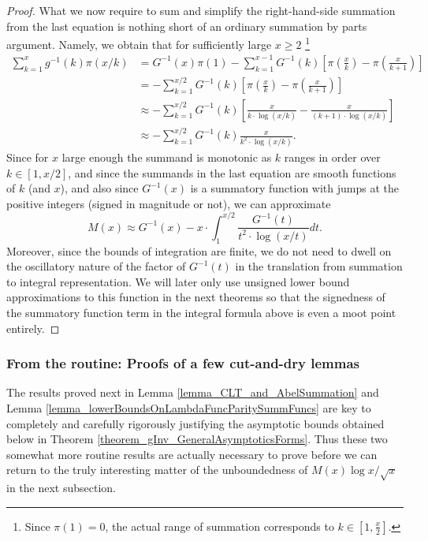 \documentclass[11pt,reqno,a4letter]{article}
\numberwithin{figure}{section}
\numberwithin{table}{section}
\theoremstyle{plain}
\numberwithin{theorem}{section}
\theoremstyle{definition}
\begin{document}
\begin{proof}
What we now require to sum and simplify the right-hand-side summation from the last equation is 
nothing short of an ordinary summation by parts argument. Namely, we obtain that for sufficiently large 
$x \geq 2$ \footnote{
     Since $\pi(1) = 0$, the actual range of summation corresponds to 
     $k \in \left[1, \frac{x}{2}\right]$. 
}
\begin{align*} 
\sum_{k=1}^{x} g^{-1}(k) \pi(x/k) & = G^{-1}(x) \pi(1) - \sum_{k=1}^{x-1} G^{-1}(k) \left[ 
     \pi\left(\frac{x}{k}\right) - \pi\left(\frac{x}{k+1}\right)\right] \\ 
     & = -\sum_{k=1}^{x/2} G^{-1}(k) \left[ 
     \pi\left(\frac{x}{k}\right) - \pi\left(\frac{x}{k+1}\right)\right] \\ 
     & \approx -\sum_{k=1}^{x/2} G^{-1}(k) \left[ 
     \frac{x}{k \cdot \log(x/k)} - \frac{x}{(k+1) \cdot \log(x/k)}\right] \\ 
     & \approx -\sum_{k=1}^{x/2} G^{-1}(k) \frac{x}{k^2 \cdot \log(x/k)}. 
\end{align*} 
Since for $x$ large enough the summand is monotonic as $k$ ranges in order over $k \in [1, x/2]$, and 
since the summands in the last equation are smooth functions of $k$ (and $x$), and also since $G^{-1}(x)$ is 
a summatory function with jumps at the positive integers (signed in magnitude or not), we can approximate 
\[
M(x) \approx G^{-1}(x) - x \cdot \int_1^{x/2} \frac{G^{-1}(t)}{t^2 \cdot \log(x/t)} dt. 
\]
Moreover, since the bounds of integration are finite, we do not need to dwell on the oscillatory nature of the 
factor of $G^{-1}(t)$ in the translation from summation to integral representation. We will 
later only use unsigned lower bound approximations to this function in the next theorems so that 
the signedness of the summatory function term in the integral formula above is even a moot point entirely. 
\end{proof} 

\subsubsection{From the routine: Proofs of a few cut-and-dry lemmas} 
\label{subsubSection_RoutineProofsNeededForMainBoundOnGInvxFunc} 

The results proved next in Lemma \ref{lemma_CLT_and_AbelSummation} and 
Lemma \ref{lemma_lowerBoundsOnLambdaFuncParitySummFuncs} 
are key to completely and carefully rigorously justifying the 
asymptotic bounds obtained below in Theorem \ref{theorem_gInv_GeneralAsymptoticsForms}. 
Thus these two somewhat more routine results are actually 
necessary to prove before we can return to the truly 
interesting matter of the unboundedness of $M(x) \log x / \sqrt{x}$ in the next subsection. 
\end{document}

